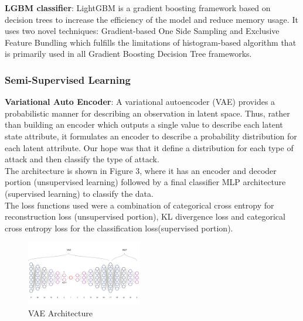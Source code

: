 \documentclass[10pt,twocolumn,letterpaper]{article}
\providecommand{\tightlist}{%
  \setlength{\itemsep}{0pt}\setlength{\parskip}{0pt}}
\begin{document}
\begin{itemsize}
     \item \textbf{LGBM classifier}:
     LightGBM is a gradient boosting framework based on decision trees to increase the efficiency of the model and reduce memory usage. It uses two novel techniques: Gradient-based One Side Sampling and Exclusive Feature Bundling which fulfills the limitations of histogram-based algorithm that is primarily used in all Gradient Boosting Decision Tree frameworks.
\end{itemsize}

\subsubsection{Semi-Supervised Learning}


\begin{itemsize}
\tightlist
    \item \textbf{Variational Auto Encoder}:
    A variational autoencoder (VAE) provides a probabilistic manner for describing an observation in latent space. Thus, rather than building an encoder which outputs a single value to describe each latent state attribute, it formulates an encoder to describe a probability distribution for each latent attribute. Our hope was that it define a distribution for each type of attack and then classify the type of attack.\\
    The architecture is shown in Figure 3, where it has an encoder and decoder portion (unsupervised learning) followed by a final classifier MLP architecture (supervised learning) to classify the data.\\
    The loss functions used were a combination of categorical cross entropy for reconstruction loss (unsupervised portion), KL divergence loss and categorical cross entropy loss for the classification loss(supervised portion).\\
    \begin{figure}[h]
    \includegraphics[width = 0.45\textwidth]{src/img/vae.png}
    \caption{VAE Architecture}
    \label{fig:incep}
\end{figure}
\end{itemsize}
\end{document}
